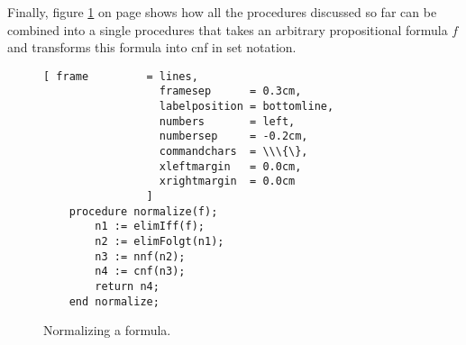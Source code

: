 Finally, figure   \ref{fig:normalize} on page \pageref{fig:normalize} shows how all the procedures
discussed so far can be combined into a single procedures that takes an arbitrary propositional
formula $f$ and transforms this formula into cnf in set notation.

\begin{figure}[!ht]
  \centering
\begin{Verbatim}[ frame         = lines, 
                  framesep      = 0.3cm, 
                  labelposition = bottomline,
                  numbers       = left,
                  numbersep     = -0.2cm,
                  commandchars  = \\\{\},
                  xleftmargin   = 0.0cm,
                  xrightmargin  = 0.0cm
                ]
    procedure normalize(f);
        n1 := elimIff(f);
        n2 := elimFolgt(n1);
        n3 := nnf(n2);
        n4 := cnf(n3);
        return n4;
    end normalize;
\end{Verbatim}
\vspace*{-0.3cm}
  \caption{Normalizing a formula.}
  \label{fig:normalize}
\end{figure}
\vspace*{\fill}


%

